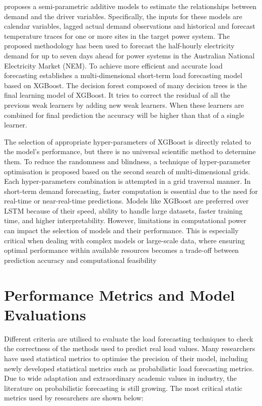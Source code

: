 \documentclass[mstat,12pt]{unswthesis}
\begin{document}
\cite{Fan2012} proposes a semi-parametric additive models to estimate
the relationships between demand and the driver variables. Specifically,
the inputs for these models are calendar variables, lagged actual demand
observations and historical and forecast temperature traces for one or
more sites in the target power system. The proposed methodology has been
used to forecast the half-hourly electricity demand for up to seven days
ahead for power systems in the Australian National Electricity Market
(NEM). To achieve more efficient and accurate load forecasting
\cite{Suo} establishes a multi-dimensional short-term load forecasting
model based on XGBoost. The decision forest composed of many decision
trees is the final learning model of XGBoost. It tries to correct the
residual of all the previous weak learners by adding new weak learners.
When these learners are combined for final prediction the accuracy will
be higher than that of a single learner.

The selection of appropriate hyper-parameters of XGBoost is directly
related to the model's performance, but there is no universal scientific
method to determine them. To reduce the randomness and blindness, a
technique of hyper-parameter optimisation is proposed based on the
second search of multi-dimensional grids. Each hyper-parameters
combination is attempted in a grid traversal manner. In short-term
demand forecasting, faster computation is essential due to the need for
real-time or near-real-time predictions. Models like XGBoost are
preferred over LSTM because of their speed, ability to handle large
datasets, faster training time, and higher interpretability. However,
limitations in computational power can impact the selection of models
and their performance. This is especially critical when dealing with
complex models or large-scale data, where ensuring optimal performance
within available resources becomes a trade-off between prediction
accuracy and computational feasibility

\section{Performance Metrics and Model
Evaluations}\label{performance-metrics-and-model-evaluations}

Different criteria are utilised to evaluate the load forecasting
techniques to check the correctness of the methods used to predict real
load values. Many researchers have used statistical metrics to optimise
the precision of their model, including newly developed statistical
metrics such as probabilistic load forecasting metrics. Due to wide
adaptation and extraordinary academic values in industry, the literature
on probabilistic forecasting is still growing. The most critical static
metrics used by researchers are shown below:
\end{document}

